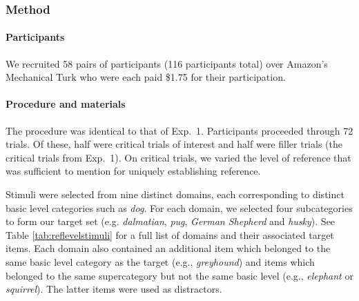 \documentclass[11pt]{article}
\newcommand{\tableref}[1]{Table \ref{#1}}
\begin{document}
\subsubsection{Method}

\paragraph{Participants}

We recruited 58 pairs of participants (116 participants total) over Amazon's Mechanical Turk who were each paid \$1.75 for their participation. 

\paragraph{Procedure and materials}

The procedure was identical to that of Exp.~1. Participants proceeded through 72 trials. Of these, half were critical trials of interest and half were filler trials (the critical trials from Exp.~1). On critical trials, we varied the level of reference that was sufficient to mention for uniquely establishing reference.

Stimuli were selected from nine distinct domains, each corresponding to distinct basic level categories such as \emph{dog}.  For each domain, we selected four subcategories to form our target set (e.g. \emph{dalmatian}, \emph{pug}, \emph{German Shepherd} and \emph{husky}). See \tableref{tab:reflevelstimuli} for a full list of domains and their associated target items. Each domain also contained an additional item which belonged to the same basic level category as the target (e.g., \emph{greyhound}) and items which belonged to the same supercategory but not the same basic level (e.g., \emph{elephant} or \emph{squirrel}). The latter items were used as distractors.
\end{document}
